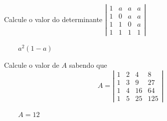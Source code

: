 \begin{exercicio}
    Calcule o valor do determinante
    \( \left|\begin{array}{cccc}
    	1 & a & a & a \\
    	1 & 0 & a & a \\
    	1 & 1 & 0 & a \\
    	1 & 1 & 1 & 1
    \end{array} \right| \)
    \begin{answers}
        \(\qquad a^{2} \left( 1 - a \right) \)
    \end{answers}
\end{exercicio}

\begin{exercicio}
    Calcule o valor de $A$ sabendo que
    \[A = \left|\begin{array}{cccc}
    	1 & 2 & 4  &  8  \\
    	1 & 3 & 9  & 27  \\
    	1 & 4 & 16 & 64  \\
    	1 & 5 & 25 & 125
    \end{array} \right|\]
    \begin{answers}
          \(\qquad A = 12\)
    \end{answers}

\end{exercicio}
